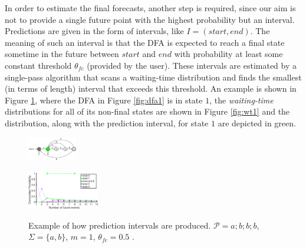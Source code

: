\par In order to estimate the final forecasts, another step is required,
since our aim is not to provide a single future point with the highest probability but an interval. 
Predictions are given in the form of intervals, like $I=(\mathit{start},\mathit{end})$. 
The meaning of such an interval is that the DFA is expected to reach a final state sometime in the future between $\mathit{start}$ and $\mathit{end}$ with probability at least some constant threshold $\theta_{fc}$ (provided by the user). 
These intervals are estimated by a single-pass algorithm that scans a waiting-time distribution and finds the smallest (in terms of length) interval that exceeds this threshold. 
An example is shown in Figure \ref{fig:wtdfas},
where the DFA in Figure \ref{fig:dfa1} is in state $1$,
the \textit{waiting-time} distributions for all of its non-final states are shown in Figure \ref{fig:wt1}
and the distribution, along with the prediction interval, for state $1$ are depicted in green.
\begin{figure}[!ht]
\begin{centering}

\includegraphics[width=0.19\textwidth]{./chapters/figures/forecasting/dfa1.pdf}
\label{fig:dfa1}


\includegraphics[width=0.28\textwidth]{./chapters/figures/forecasting/wt1.pdf}
\label{fig:wt1}

\caption{Example of how prediction intervals are produced. 
$\mathcal{P}=a ; b ; b ; b$, $\Sigma=\{a,b\}$, $m=1$, $\theta_{\mathit{fc}}=0.5$      \cite{alevizos2017event}.}
\label{fig:wtdfas}
\end{centering}
\end{figure}

